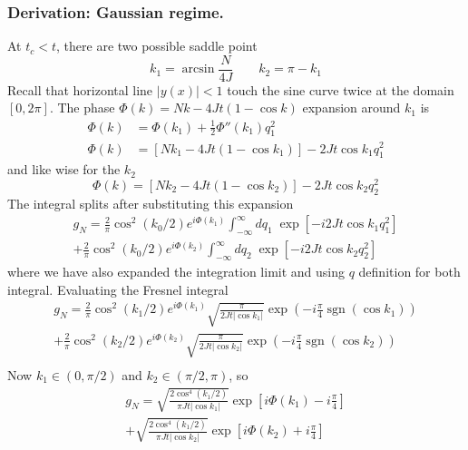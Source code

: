 \documentclass[../../../main.tex]{subfiles}
\begin{document}
\subsubsection{Derivation: Gaussian regime.}
At $t_c<t$, there are two possible saddle point
\begin{equation*}
  k_1 = \arcsin \frac{N }{4J}\qquad
  k_2 = \pi -k_1
\end{equation*}
Recall that horizontal line $|y(x)|<1$ touch the sine curve twice at the domain $[0,2\pi]$.
The phase $\Phi(k) =  Nk - 4Jt (1  - \cos k) $ expansion around $k_1$ is
\begin{align*}
  \Phi(k) & = \Phi(k_1) + \frac{1}{2}\Phi''(k_1) q_1^2                      \\
  \Phi(k) & =  \left[ N k_1 - 4Jt(1- \cos k_1) \right] - 2Jt \cos k_1 q_1^2
\end{align*}
and like wise for the $k_2$
\begin{equation*}
  \Phi(k)  =  \left[ N k_2 - 4Jt(1- \cos k_2) \right] - 2Jt \cos k_2 q_2^2
\end{equation*}
The integral splits after substituting this expansion
\begin{multline*}
  g_N = \frac{2}{\pi} \cos^2 (k_0/2) e ^{i\Phi(k_1)}\int_{-\infty} ^{\infty} dq_1\; \exp \left[ - i 2 Jt \cos k_1 q_1^2\right] \\
  + \frac{2}{\pi} \cos^2 (k_0/2) e ^{i\Phi(k_2)}\int_{-\infty} ^{\infty} dq_2\; \exp \left[ - i 2 Jt \cos k_2 q_2^2\right]
\end{multline*}
where we have also expanded the integration limit and using $q$ definition for both integral.
Evaluating the Fresnel integral
\begin{multline*}
  g_N = \frac{2}{\pi} \cos^2 (k_1/2) e ^{i\Phi(k_1)} \sqrt{\frac{\pi }{2Jt |\cos k_1|}} \exp \left( -i \frac{\pi }{4} \operatorname{sgn} (\cos k_1) \right)  \\
  + \frac{2}{\pi} \cos^2 (k_2/2) e ^{i\Phi(k_2)} \sqrt{\frac{\pi }{2Jt |\cos k_2|}} \exp \left( -i \frac{\pi }{4} \operatorname{sgn} (\cos k_2) \right)  \\
\end{multline*}
Now $k_1 \in (0,\pi/2)$ and $k_2 \in (\pi/2,\pi)$, so
\begin{multline*}
  g_N = \sqrt{\frac{2 \cos^4 (k_1/2)}{\pi Jt |\cos k_1|}} \exp \left[ i\Phi(k_1) -i \frac{\pi }{4}\right]  \\
  + \sqrt{\frac{2 \cos^4 (k_1/2)}{\pi Jt |\cos k_2|}} \exp \left[i\Phi(k_2) +i \frac{\pi }{4}  \right]
\end{multline*}
\end{document}
